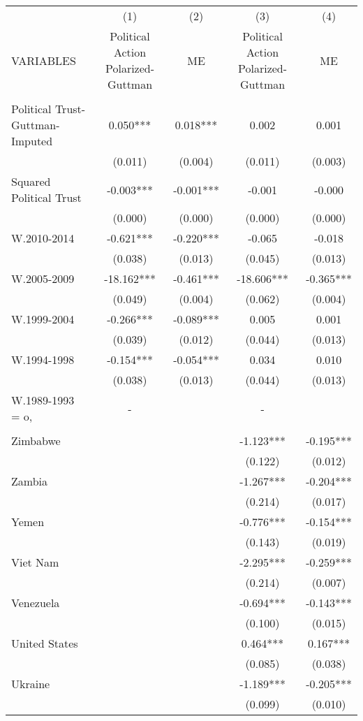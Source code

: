 \documentclass[]{article}
\begin{document}
\begin{tabular}{lcccc} \hline
 & (1) & (2) & (3) & (4) \\
VARIABLES & Political Action Polarized-Guttman & ME & Political Action Polarized-Guttman & ME \\ \hline
 &  &  &  &  \\
Political Trust-Guttman-Imputed & 0.050*** & 0.018*** & 0.002 & 0.001 \\
 & (0.011) & (0.004) & (0.011) & (0.003) \\
Squared Political Trust & -0.003*** & -0.001*** & -0.001 & -0.000 \\
 & (0.000) & (0.000) & (0.000) & (0.000) \\
W.2010-2014 & -0.621*** & -0.220*** & -0.065 & -0.018 \\
 & (0.038) & (0.013) & (0.045) & (0.013) \\
W.2005-2009 & -18.162*** & -0.461*** & -18.606*** & -0.365*** \\
 & (0.049) & (0.004) & (0.062) & (0.004) \\
W.1999-2004 & -0.266*** & -0.089*** & 0.005 & 0.001 \\
 & (0.039) & (0.012) & (0.044) & (0.013) \\
W.1994-1998 & -0.154*** & -0.054*** & 0.034 & 0.010 \\
 & (0.038) & (0.013) & (0.044) & (0.013) \\
W.1989-1993 = o, & - &  & - &  \\
 &  &  &  &  \\
Zimbabwe &  &  & -1.123*** & -0.195*** \\
 &  &  & (0.122) & (0.012) \\
Zambia &  &  & -1.267*** & -0.204*** \\
 &  &  & (0.214) & (0.017) \\
Yemen &  &  & -0.776*** & -0.154*** \\
 &  &  & (0.143) & (0.019) \\
Viet Nam &  &  & -2.295*** & -0.259*** \\
 &  &  & (0.214) & (0.007) \\
Venezuela &  &  & -0.694*** & -0.143*** \\
 &  &  & (0.100) & (0.015) \\
United States &  &  & 0.464*** & 0.167*** \\
 &  &  & (0.085) & (0.038) \\
Ukraine &  &  & -1.189*** & -0.205*** \\
 &  &  & (0.099) & (0.010) \\

\end{tabular}
\end{document}
